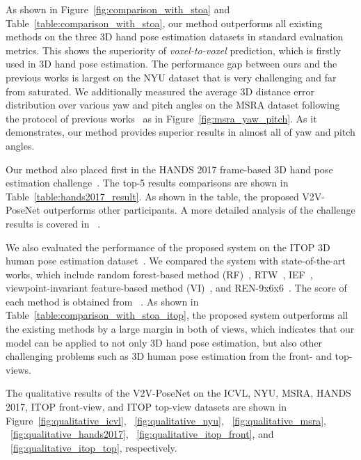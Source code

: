 As shown in Figure~\ref{fig:comparison_with_stoa} and Table~\ref{table:comparison_with_stoa}, our method outperforms all existing methods on the three 3D hand pose estimation datasets in standard evaluation metrics. This shows the superiority of \emph{voxel-to-voxel} prediction, which is firstly used in 3D hand pose estimation. The performance gap between ours and the previous works is largest on the NYU dataset that is very challenging and far from saturated. We additionally measured the average 3D distance error distribution over various yaw and pitch angles on the MSRA dataset following the protocol of previous works~\cite{sun2015cascaded} as in Figure~\ref{fig:msra_yaw_pitch}. As it demonstrates, our method provides superior results in almost all of yaw and pitch angles.

Our method also placed first in the HANDS 2017 frame-based 3D hand pose estimation challenge~\cite{yuan20172017}. The top-5 results comparisons are shown in Table~\ref{table:hands2017_result}. As shown in the table, the proposed V2V-PoseNet outperforms other participants. A more detailed analysis of the challenge results is covered in ~\cite{yuan20183d}.

We also evaluated the performance of the proposed system on the ITOP 3D human pose estimation dataset~\cite{haque2016towards}. We compared the system with state-of-the-art works, which include random forest-based method (RF)~\cite{shotton2013real}, RTW~\cite{yub2015random}, IEF~\cite{carreira2016human}, viewpoint-invariant feature-based method (VI)~\cite{haque2016towards}, and  REN-9x6x6~\cite{guo2017towards}. The score of each method is obtained from ~\cite{haque2016towards,guo2017towards}. As shown in Table~\ref{table:comparison_with_stoa_itop}, the proposed system outperforms all the existing methods by a large margin in both of views, which indicates that our model can be applied to not only 3D hand pose estimation, but also other challenging problems such as 3D human pose estimation from the front- and top-views. 

The qualitative results of the V2V-PoseNet on the ICVL, NYU, MSRA, HANDS 2017, ITOP front-view, and ITOP top-view datasets are shown in Figure~\ref{fig:qualitative_icvl}, ~\ref{fig:qualitative_nyu}, ~\ref{fig:qualitative_msra}, ~\ref{fig:qualitative_hands2017}, ~\ref{fig:qualitative_itop_front}, and ~\ref{fig:qualitative_itop_top}, respectively.






